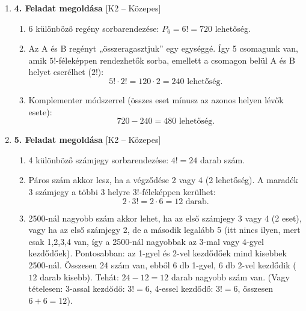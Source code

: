 \documentclass[12pt,a4paper]{article}
\begin{document}
\begin{enumerate}[label=\arabic*., leftmargin=*]
    \vspace{0.3cm}

    \item \textbf{4. Feladat megoldása} \textsf{\small [K2 – Közepes]}
    \begin{enumerate}[label=\alph*)]
        \item 6 különböző regény sorbarendezése: $P_6 = 6! = 720$ lehetőség.
        \item Az A és B regényt „összeragasztjuk” egy egységgé. Így 5 csomagunk van, amik $5!$-féleképpen rendezhetők sorba, emellett a csomagon belül A és B helyet cserélhet ($2!$):
        \[
        5! \cdot 2! = 120 \cdot 2 = 240 \text{ lehetőség.}
        \]
        \item Komplementer módszerrel (összes eset mínusz az azonos helyen lévők esete):
        \[
        720 - 240 = 480 \text{ lehetőség.}
        \]
    \end{enumerate}

    \vspace{0.3cm}

    \item \textbf{5. Feladat megoldása} \textsf{\small [K2 – Közepes]}
    \begin{enumerate}[label=\alph*)]
        \item 4 különböző számjegy sorbarendezése: $4! = 24$ darab szám.
        \item Páros szám akkor lesz, ha a végződése 2 vagy 4 (2 lehetőség). A maradék 3 számjegy a többi 3 helyre $3!$-féleképpen kerülhet:
        \[
        2 \cdot 3! = 2 \cdot 6 = 12 \text{ darab.}
        \]
        \item 2500-nál nagyobb szám akkor lehet, ha az első számjegy 3 vagy 4 (2 eset), vagy ha az első számjegy 2, de a második legalább 5 (itt nincs ilyen, mert csak 1,2,3,4 van, így a 2500-nál nagyobbak az 3-mal vagy 4-gyel kezdődőek). Pontosabban: az 1-gyel és 2-vel kezdődőek mind kisebbek 2500-nál. Összesen 24 szám van, ebből 6 db 1-gyel, 6 db 2-vel kezdődik ($12$ darab kisebb). Tehát: $24 - 12 = 12$ darab nagyobb szám van. (Vagy tételesen: 3-assal kezdődő: $3! = 6$, 4-essel kezdődő: $3! = 6$, összesen $6+6=12$).
    \end{enumerate}

    \vspace{0.3cm}


\end{enumerate}
\end{document}
